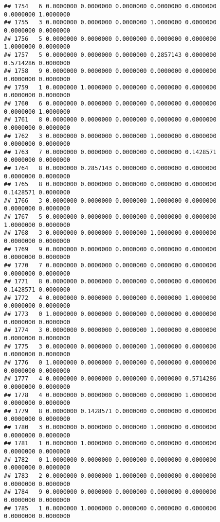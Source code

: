 \documentclass[
]{article}
\begin{document}
\begin{verbatim}
## 1754   6 0.0000000 0.0000000 0.0000000 0.0000000 0.0000000 0.0000000 1.0000000
## 1755   3 0.0000000 0.0000000 0.0000000 1.0000000 0.0000000 0.0000000 0.0000000
## 1756   5 0.0000000 0.0000000 0.0000000 0.0000000 0.0000000 1.0000000 0.0000000
## 1757   5 0.0000000 0.0000000 0.0000000 0.2857143 0.0000000 0.5714286 0.0000000
## 1758   9 0.0000000 0.0000000 0.0000000 0.0000000 0.0000000 0.0000000 0.0000000
## 1759   1 0.0000000 1.0000000 0.0000000 0.0000000 0.0000000 0.0000000 0.0000000
## 1760   6 0.0000000 0.0000000 0.0000000 0.0000000 0.0000000 0.0000000 1.0000000
## 1761   8 0.0000000 0.0000000 0.0000000 0.0000000 0.0000000 0.0000000 0.0000000
## 1762   3 0.0000000 0.0000000 0.0000000 1.0000000 0.0000000 0.0000000 0.0000000
## 1763   7 0.0000000 0.0000000 0.0000000 0.0000000 0.1428571 0.0000000 0.0000000
## 1764   8 0.0000000 0.2857143 0.0000000 0.0000000 0.0000000 0.0000000 0.0000000
## 1765   8 0.0000000 0.0000000 0.0000000 0.0000000 0.0000000 0.1428571 0.0000000
## 1766   3 0.0000000 0.0000000 0.0000000 1.0000000 0.0000000 0.0000000 0.0000000
## 1767   5 0.0000000 0.0000000 0.0000000 0.0000000 0.0000000 1.0000000 0.0000000
## 1768   3 0.0000000 0.0000000 0.0000000 1.0000000 0.0000000 0.0000000 0.0000000
## 1769   9 0.0000000 0.0000000 0.0000000 0.0000000 0.0000000 0.0000000 0.0000000
## 1770   7 0.0000000 0.0000000 0.0000000 0.0000000 0.0000000 0.0000000 0.0000000
## 1771   8 0.0000000 0.0000000 0.0000000 0.0000000 0.0000000 0.1428571 0.0000000
## 1772   4 0.0000000 0.0000000 0.0000000 0.0000000 1.0000000 0.0000000 0.0000000
## 1773   0 1.0000000 0.0000000 0.0000000 0.0000000 0.0000000 0.0000000 0.0000000
## 1774   3 0.0000000 0.0000000 0.0000000 1.0000000 0.0000000 0.0000000 0.0000000
## 1775   3 0.0000000 0.0000000 0.0000000 1.0000000 0.0000000 0.0000000 0.0000000
## 1776   0 1.0000000 0.0000000 0.0000000 0.0000000 0.0000000 0.0000000 0.0000000
## 1777   4 0.0000000 0.0000000 0.0000000 0.0000000 0.5714286 0.0000000 0.0000000
## 1778   4 0.0000000 0.0000000 0.0000000 0.0000000 1.0000000 0.0000000 0.0000000
## 1779   8 0.0000000 0.1428571 0.0000000 0.0000000 0.0000000 0.0000000 0.0000000
## 1780   3 0.0000000 0.0000000 0.0000000 1.0000000 0.0000000 0.0000000 0.0000000
## 1781   1 0.0000000 1.0000000 0.0000000 0.0000000 0.0000000 0.0000000 0.0000000
## 1782   0 1.0000000 0.0000000 0.0000000 0.0000000 0.0000000 0.0000000 0.0000000
## 1783   2 0.0000000 0.0000000 1.0000000 0.0000000 0.0000000 0.0000000 0.0000000
## 1784   9 0.0000000 0.0000000 0.0000000 0.0000000 0.0000000 0.0000000 0.0000000
## 1785   1 0.0000000 1.0000000 0.0000000 0.0000000 0.0000000 0.0000000 0.0000000

\end{verbatim}
\end{document}
